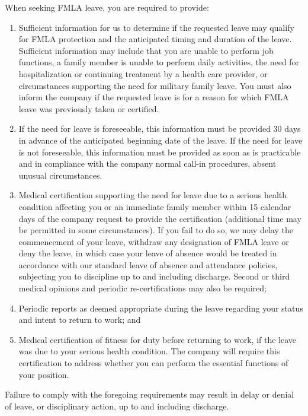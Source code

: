 \documentclass{book}
\begin{document}
When seeking FMLA leave, you are required to provide:

\begin{enumerate} \item Sufficient information for us to determine if the requested leave may qualify for FMLA protection and the anticipated timing and duration of the leave. Sufficient information may include that you are unable to perform job functions, a family member is unable to perform daily activities, the need for hospitalization or continuing treatment by a health care provider, or circumstances supporting the need for military family leave. You must also inform the company if the requested leave is for a reason for which FMLA leave was previously taken or certified.

\item If the need for leave is foreseeable, this information must be provided 30 days in advance of the anticipated beginning date of the leave. If the need for leave is not foreseeable, this information must be provided as soon as is practicable and in compliance with the company normal call-in procedures, absent unusual circumstances.

\item Medical certification supporting the need for leave due to a serious health condition affecting you or an immediate family member within 15 calendar days of the company request to provide the certification (additional time may be permitted in some circumstances). If you fail to do so, we may delay the commencement of your leave, withdraw any designation of FMLA leave or deny the leave, in which case your leave of absence would be treated in accordance with our standard leave of absence and attendance policies, subjecting you to discipline up to and including discharge. Second or third medical opinions and periodic re-certifications may also be required;

\item Periodic reports as deemed appropriate during the leave regarding your status and intent to return to work; and

\item Medical certification of fitness for duty before returning to work, if the leave was due to your serious health condition. The company will require this certification to address whether you can perform the essential functions of your position. \end{enumerate}

Failure to comply with the foregoing requirements may result in delay or denial of leave, or disciplinary action, up to and including discharge.
\end{document}
